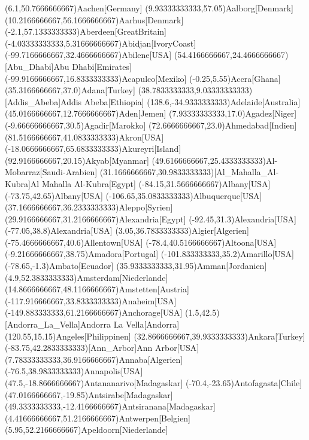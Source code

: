 \mapput(6.1,50.7666666667){Aachen}[Germany]
\mapput(9.93333333333,57.05){Aalborg}[Denmark]
\mapput(10.2166666667,56.1666666667){Aarhus}[Denmark]
\mapput(-2.1,57.1333333333){Aberdeen}[GreatBritain]
\mapput(-4.03333333333,5.31666666667){Abidjan}[IvoryCoast]
\mapput(-99.7166666667,32.4666666667){Abilene}[USA]
\mapput(54.4166666667,24.4666666667)[Abu_Dhabi]{Abu Dhabi}[Emirates]
\mapput(-99.9166666667,16.8333333333){Acapulco}[Mexiko]
\mapput(-0.25,5.55){Accra}[Ghana]
\mapput(35.3166666667,37.0){Adana}[Turkey]
\mapput(38.7833333333,9.03333333333)[Addis_Abeba]{Addis Abeba}[Ethiopia]
\mapput(138.6,-34.9333333333){Adelaide}[Australia]
\mapput(45.0166666667,12.7666666667){Aden}[Jemen]
\mapput(7.93333333333,17.0){Agadez}[Niger]
\mapput(-9.66666666667,30.5){Agadir}[Marokko]
\mapput(72.6666666667,23.0){Ahmedabad}[Indien]
\mapput(81.5166666667,41.0833333333){Akron}[USA]
\mapput(-18.0666666667,65.6833333333){Akureyri}[Island]
\mapput(92.9166666667,20.15){Akyab}[Myanmar]
\mapput(49.6166666667,25.4333333333){Al-Mobarraz}[Saudi-Arabien]
\mapput(31.1666666667,30.9833333333)[Al_Mahalla_Al-Kubra]{Al Mahalla Al-Kubra}[Egypt]
\mapput(-84.15,31.5666666667){Albany}[USA]
\mapput(-73.75,42.65){Albany}[USA]
\mapput(-106.65,35.0833333333){Albuquerque}[USA]
\mapput(37.1666666667,36.2333333333){Aleppo}[Syrien]
\mapput(29.9166666667,31.2166666667){Alexandria}[Egypt]
\mapput(-92.45,31.3){Alexandria}[USA]
\mapput(-77.05,38.8){Alexandria}[USA]
\mapput(3.05,36.7833333333){Algier}[Algerien]
\mapput(-75.4666666667,40.6){Allentown}[USA]
\mapput(-78.4,40.5166666667){Altoona}[USA]
\mapput(-9.21666666667,38.75){Amadora}[Portugal]
\mapput(-101.833333333,35.2){Amarillo}[USA]
\mapput(-78.65,-1.3){Ambato}[Ecuador]
\mapput(35.9333333333,31.95){Amman}[Jordanien]
\mapput(4.9,52.3833333333){Amsterdam}[Niederlande]
\mapput(14.8666666667,48.1166666667){Amstetten}[Austria]
\mapput(-117.916666667,33.8333333333){Anaheim}[USA]
\mapput(-149.883333333,61.2166666667){Anchorage}[USA]
\mapput(1.5,42.5)[Andorra_La_Vella]{Andorra La Vella}[Andorra]
\mapput(120.55,15.15){Angeles}[Philippinen]
\mapput(32.8666666667,39.9333333333){Ankara}[Turkey]
\mapput(-83.75,42.2833333333)[Ann_Arbor]{Ann Arbor}[USA]
\mapput(7.78333333333,36.9166666667){Annaba}[Algerien]
\mapput(-76.5,38.9833333333){Annapolis}[USA]
\mapput(47.5,-18.8666666667){Antananarivo}[Madagaskar]
\mapput(-70.4,-23.65){Antofagasta}[Chile]
\mapput(47.0166666667,-19.85){Antsirabe}[Madagaskar]
\mapput(49.3333333333,-12.4166666667){Antsiranana}[Madagaskar]
\mapput(4.41666666667,51.2166666667){Antwerpen}[Belgien]
\mapput(5.95,52.2166666667){Apeldoorn}[Niederlande]
